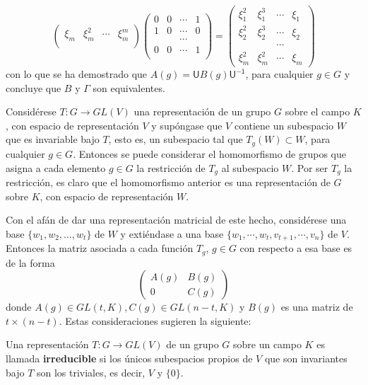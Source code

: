 \begin{ejemplo}
\begin{equation*}
\begin{pmatrix}
 \xi_m & \xi_m^2 & \cdots & \xi_m^m \\
\end{pmatrix}
\begin{pmatrix}
0 & 0 & \cdots & 1 \\
1 & 0 & \cdots & 0 \\
 & & \cdots & \\
0 & 0 & \cdots & 1 \\
\end{pmatrix} = \begin{pmatrix}
\xi_1^2 & \xi_1^3 & \cdots & \xi_1 \\
\xi_2^2 & \xi_2^3 & \cdots & \xi_2 \\
 & & \cdots & \\
\xi_m^2 & \xi_m^2 & \cdots & \xi_m
\end{pmatrix}
\end{equation*} con lo que se ha demostrado que $A(g) = \mathsf{U}B(g)\mathsf{U^{-1}}$, para cualquier $g \in G$ y concluye que $B$ y $\Gamma$ son equivalentes. 
\end{ejemplo}

Considérese $T \colon G \to GL(V)$ una representación de un grupo $G$ sobre el campo $K$, con espacio de representación $V$ y supóngase que $V$ contiene un subespacio $W$ que es invariable bajo $T$, esto es, un subespacio tal que $T_g(W) \subset W$, para cualquier $g \in G$. Entonces se puede considerar el homomorfismo de grupos que asigna a cada elemento $g \in G$ la restricción de $T_g$ al subespacio $W$. Por ser $T_g$ la restricción, es claro que el homomorfismo anterior es una representación de $G$ sobre $K$, con espacio de representación $W$.

Con el afán de dar una representación matricial de este hecho, considérese una base $\{ w_1, w_2, \dots, w_t \}$ de $W$ y extiéndase a una base $ \{ w_1, \cdots, w_t, v_{t+1}, \cdots, v_n \}$ de $V$. Entonces la matriz asociada a cada función $T_g$, $g \in G$ con respecto a esa base es de la forma
\begin{equation*} \begin{pmatrix}
A(g) & B(g) \\
0 & C(g)
\end{pmatrix} \end{equation*} donde $A(g) \in GL(t,K), C(g) \in GL(n-t,K)$ y $B(g)$ es una matriz de $t \times (n-t)$. Estas consideraciones sugieren la siguiente:
\begin{definicion}
Una representación $T \colon G \to GL(V)$ de un grupo $G$ sobre un campo $K$ es llamada \textbf{irreducible} si los únicos subespacios propios de $V$ que son invariantes bajo $T$ son los triviales, es decir, $V$ y $\{ 0 \}$.
\end{definicion}


